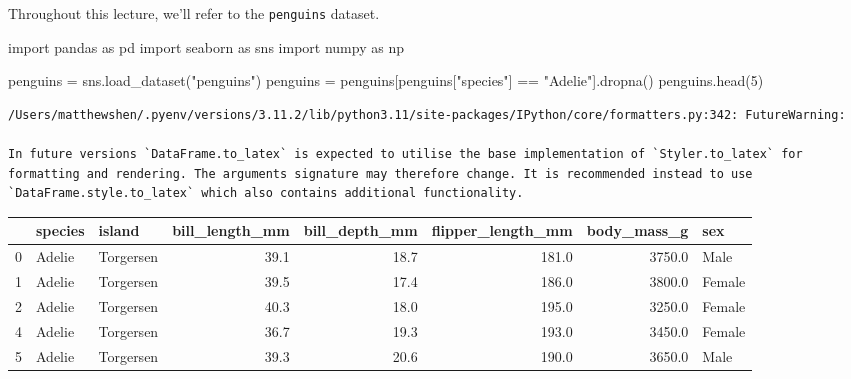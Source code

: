 \documentclass[
  letterpaper,
  DIV=11,
  numbers=noendperiod]{scrreprt}
\newenvironment{Shaded}{\begin{snugshade}}{\end{snugshade}}
\newcommand{\DecValTok}[1]{\textcolor[rgb]{0.68,0.00,0.00}{#1}}
\newcommand{\ImportTok}[1]{\textcolor[rgb]{0.00,0.46,0.62}{#1}}
\newcommand{\NormalTok}[1]{\textcolor[rgb]{0.00,0.23,0.31}{#1}}
\newcommand{\OperatorTok}[1]{\textcolor[rgb]{0.37,0.37,0.37}{#1}}
\newcommand{\StringTok}[1]{\textcolor[rgb]{0.13,0.47,0.30}{#1}}
\begin{document}
Throughout this lecture, we'll refer to the \texttt{penguins} dataset.

\begin{Shaded}
\begin{Highlighting}[]
\ImportTok{import}\NormalTok{ pandas }\ImportTok{as}\NormalTok{ pd}
\ImportTok{import}\NormalTok{ seaborn }\ImportTok{as}\NormalTok{ sns}
\ImportTok{import}\NormalTok{ numpy }\ImportTok{as}\NormalTok{ np}

\NormalTok{penguins }\OperatorTok{=}\NormalTok{ sns.load\_dataset(}\StringTok{"penguins"}\NormalTok{)}
\NormalTok{penguins }\OperatorTok{=}\NormalTok{ penguins[penguins[}\StringTok{"species"}\NormalTok{] }\OperatorTok{==} \StringTok{"Adelie"}\NormalTok{].dropna()}
\NormalTok{penguins.head(}\DecValTok{5}\NormalTok{)}
\end{Highlighting}
\end{Shaded}

\begin{verbatim}
/Users/matthewshen/.pyenv/versions/3.11.2/lib/python3.11/site-packages/IPython/core/formatters.py:342: FutureWarning:

In future versions `DataFrame.to_latex` is expected to utilise the base implementation of `Styler.to_latex` for formatting and rendering. The arguments signature may therefore change. It is recommended instead to use `DataFrame.style.to_latex` which also contains additional functionality.
\end{verbatim}

\begin{tabular}{lllrrrrl}
\toprule
{} & species &     island &  bill\_length\_mm &  bill\_depth\_mm &  flipper\_length\_mm &  body\_mass\_g &     sex \\
\midrule
0 &  Adelie &  Torgersen &            39.1 &           18.7 &              181.0 &       3750.0 &    Male \\
1 &  Adelie &  Torgersen &            39.5 &           17.4 &              186.0 &       3800.0 &  Female \\
2 &  Adelie &  Torgersen &            40.3 &           18.0 &              195.0 &       3250.0 &  Female \\
4 &  Adelie &  Torgersen &            36.7 &           19.3 &              193.0 &       3450.0 &  Female \\
5 &  Adelie &  Torgersen &            39.3 &           20.6 &              190.0 &       3650.0 &    Male \\
\bottomrule
\end{tabular}
\end{document}
